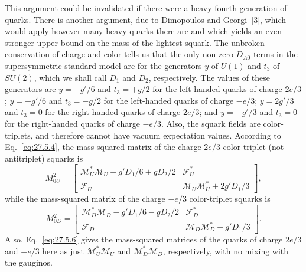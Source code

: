 This argument could be invalidated if there were a heavy fourth generation
of quarks. There is another argument, due to Dimopoulos and
Georgi~\hyperref[ch28-ref-3]{[3]}, which would apply however many heavy
quarks there are and which yields an even stronger upper bound on the mass
of the lightest squark. The unbroken conservation of charge and color tells
us that the only non-zero \(D_{A0}\)-terms in the supersymmetric standard
model are for the generators \(y\) of \(U(1)\) and \(t_3\) of \(SU(2)\),
which we shall call \(D_1\) and \(D_2\), respectively. The values of these
generators are \(y=-g'/6\) and \(t_3=+g/2\) for the left-handed quarks of
charge \(2e/3\); \(y=-g'/6\) and \(t_3=-g/2\) for the left-handed quarks
of charge \(-e/3\); \(y=2g'/3\) and \(t_3=0\) for the right-handed quarks
of charge \(2e/3\); and \(y=-g'/3\) and \(t_3=0\) for the right-handed
quarks of charge \(-e/3\). Also, the squark fields are color-triplets, and
therefore cannot have vacuum expectation values. According to
Eq.~\eqref{eq:27.5.4}, the mass-squared matrix of the charge \(2e/3\)
color-triplet (not antitriplet) squarks is
\begin{equation}
  M_{0U}^2
  =
  \begin{bmatrix}
    \mathcal{M}_U^*\mathcal{M}_U-g'D_1/6+gD_2/2
      & \mathcal{F}_U^* \\
    \mathcal{F}_U
      & \mathcal{M}_U\mathcal{M}_U^*+2g'D_1/3
  \end{bmatrix},
  \tag{28.3.2}\label{eq:28.3.2}
\end{equation}
while the mass-squared matrix of the charge \(-e/3\) color-triplet squarks
is
\begin{equation}
  M_{0D}^2
  =
  \begin{bmatrix}
    \mathcal{M}_D^*\mathcal{M}_D-g'D_1/6-gD_2/2
      & \mathcal{F}_D^* \\
    \mathcal{F}_D
      & \mathcal{M}_D\mathcal{M}_D^*-g'D_1/3
  \end{bmatrix}.
  \tag{28.3.3}\label{eq:28.3.3}
\end{equation}
Also, Eq.~\eqref{eq:27.5.6} gives the mass-squared matrices of the quarks of
charge \(2e/3\) and \(-e/3\) here as just
\(\mathcal{M}_U^*\mathcal{M}_U\) and
\(\mathcal{M}_D^*\mathcal{M}_D\), respectively, with no mixing with the
gauginos.

